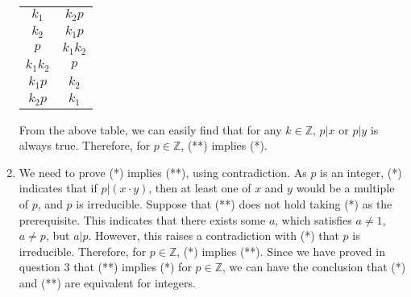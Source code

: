 \documentclass[12pt, a4paper]{article}
\begin{document}
\begin{enumerate}
\begin{center}
\begin{tabular}{c|c}
                      \hline
                      $k_1$ & $k_2p$\\
                      $k_2$ & $k_1p$\\
                      $p$ & $k_1k_2$\\
                      $k_1k_2$ & $p$\\
                      $k_1p$ & $k_2$\\
                      $k_2p$ & $k_1$
                \end{tabular}
          \end{center}
          From the above table, we can easily find that for any $k\in \mathbb{Z}$, 
          $p|x$ or $p|y$ is always true.\newline
          Therefore, for $p\in \mathbb{Z}$, (**) implies (*).
    \item We need to prove (*) implies (**), using contradiction.\newline
          As $p$ is an integer, (*) indicates that if $p | (x\cdot y)$, 
          then at least one of $x$ and $y$ would be a multiple of $p$, 
          and $p$ is irreducible.\newline
          Suppose that (**) does not hold taking (*) as the prerequisite. 
          This indicates that there exists some $a$, which satisfies $a\neq 1$, $a\neq p$, 
          but $a | p$. However, this raises a contradiction with (*) that $p$ is irreducible. 
          Therefore, for $p\in \mathbb{Z}$, (*) implies (**).\newline
          Since we have proved in question 3 that (**) implies (*) for $p\in \mathbb{Z}$, 
          we can have the conclusion that (*) and (**) are equivalent for integers.

\end{enumerate}
\end{document}
